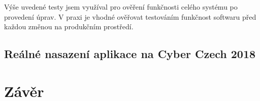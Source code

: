 \documentclass[
  digital, %
  twoside, %
  table,   %
  lof,     %
  lot,     %
]{fithesis3}
\begin{document}
Výše uvedené testy jsem využíval pro ověření funkčnosti celého systému po provedení úprav. V praxi je vhodné ověřovat testováním funkčnost softwaru před každou změnou na produkčním prostředí.

\section{Reálné nasazení aplikace na Cyber Czech 2018}



\chapter{Závěr}

\printbibliography[heading=bibintoc] %
\end{document}
